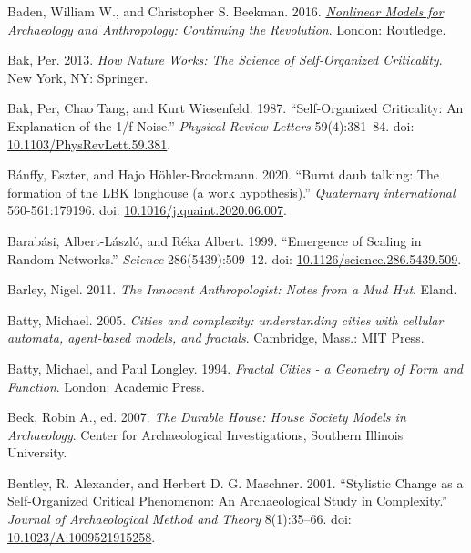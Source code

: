 \documentclass[
  12pt,
]{book}
\newlength{\cslhangindent}
\newlength{\cslentryspacingunit} %
\newenvironment{CSLReferences}[2] %
 {%
  \setlength{\parindent}{0pt}
  \ifodd #1
  \let\oldpar\par
  \def\par{\hangindent=\cslhangindent\oldpar}
  \fi
  \setlength{\parskip}{#2\cslentryspacingunit}
 }%
 {}
\begin{document}
\begin{CSLReferences}{1}{0}
\leavevmode{}%
Baden, William W., and Christopher S. Beekman. 2016. \emph{\href{https://doi.org/10.4324/9781315247908}{Nonlinear Models for Archaeology and Anthropology: Continuing the Revolution}}. London: Routledge.

\leavevmode{}%
Bak, Per. 2013. \emph{How {Nature Works}: {The Science} of {Self-Organized Criticality}}. {New York, NY}: {Springer}.

\leavevmode{}%
Bak, Per, Chao Tang, and Kurt Wiesenfeld. 1987. {``Self-Organized Criticality: {An} Explanation of the 1/f Noise.''} \emph{Physical Review Letters} 59(4):381--84. doi: \href{https://doi.org/10.1103/PhysRevLett.59.381}{10.1103/PhysRevLett.59.381}.

\leavevmode{}%
Bánffy, Eszter, and Hajo Höhler-Brockmann. 2020. {``Burnt daub talking: The formation of the LBK longhouse (a work hypothesis).''} \emph{Quaternary international} 560-561:179196. doi: \href{https://doi.org/10.1016/j.quaint.2020.06.007}{10.1016/j.quaint.2020.06.007}.

\leavevmode{}%
Barabási, Albert-László, and Réka Albert. 1999. {``Emergence of Scaling in Random Networks.''} \emph{Science} 286(5439):509--12. doi: \href{https://doi.org/10.1126/science.286.5439.509}{10.1126/science.286.5439.509}.

\leavevmode{}%
Barley, Nigel. 2011. \emph{The Innocent Anthropologist: Notes from a Mud Hut}. Eland.

\leavevmode{}%
Batty, Michael. 2005. \emph{Cities and complexity: understanding cities with cellular automata, agent-based models, and fractals}. Cambridge, Mass.: MIT Press.

\leavevmode{}%
Batty, Michael, and Paul Longley. 1994. \emph{Fractal Cities - a Geometry of Form and Function}. London: Academic Press.

\leavevmode{}%
Beck, Robin A., ed. 2007. \emph{The Durable House: House Society Models in Archaeology}. Center for Archaeological Investigations, Southern Illinois University.

\leavevmode{}%
Bentley, R. Alexander, and Herbert D. G. Maschner. 2001. {``Stylistic {Change} as a {Self-Organized Critical Phenomenon}: {An Archaeological Study} in {Complexity}.''} \emph{Journal of Archaeological Method and Theory} 8(1):35--66. doi: \href{https://doi.org/10.1023/A:1009521915258}{10.1023/A:1009521915258}.


\end{CSLReferences}
\end{document}
